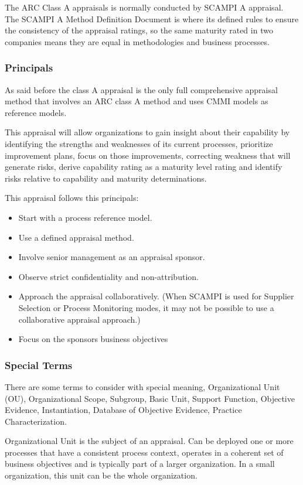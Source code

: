 The ARC Class A appraisals is normally conducted by SCAMPI A appraisal. The SCAMPI A Method Definition Document is where its defined rules to ensure the consistency of the appraisal ratings, so the same maturity rated in two companies means they are equal in methodologies and business processes.


\subsubsection{Principals}
As said before the class A appraisal is the only full comprehensive appraisal method that involves an ARC class A method and uses CMMI models as reference models.

This appraisal will allow organizations to gain insight about their capability by identifying the strengths and weaknesses of its current processes, prioritize improvement plans, focus on those improvements, correcting weakness that will generate risks, derive capability rating as a maturity level rating and identify risks relative to capability and maturity determinations.

This appraisal follows this principals:
\begin{itemize}
	\item Start with a process reference model.
	\item Use a defined appraisal method.
	\item Involve senior management as an appraisal sponsor.
	\item Observe strict confidentiality and non-attribution.
	\item Approach the appraisal collaboratively. (When SCAMPI is used for Supplier Selection or Process Monitoring modes, it may not be
	possible to use a collaborative appraisal approach.)
	\item Focus on the sponsors business objectives
\end{itemize}

\subsubsection{Special Terms}
There are some terms to consider with special meaning, Organizational Unit (OU), Organizational Scope, Subgroup, Basic Unit, Support Function, Objective Evidence, Instantiation, Database of Objective Evidence, Practice Characterization.

Organizational Unit is the subject of an appraisal. Can be deployed one or more processes that have a consistent process context, operates in a coherent set of business objectives and is typically part of a larger organization. In a small organization, this unit can be the whole organization.

